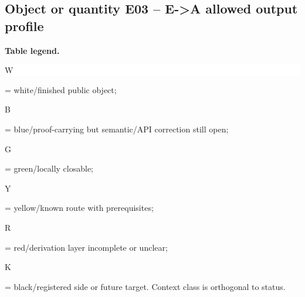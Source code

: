 \subsection*{Object or quantity E03 -- E->A allowed output profile}
\hypertarget{objproof:E03}{}
\par\smallskip\noindent\begin{minipage}{0.99\linewidth}\footnotesize\raggedright\textbf{Table legend.} \colorbox{white}{\strut W} = white/finished public object; \colorbox{cyan!20}{\strut B} = blue/proof-carrying but semantic/API correction still open; \colorbox{green!18}{\strut G} = green/locally closable; \colorbox{yellow!25}{\strut Y} = yellow/known route with prerequisites; \colorbox{red!20}{\strut R} = red/derivation layer incomplete or unclear; \colorbox{black!18}{\strut K} = black/registered side or future target. Context class is orthogonal to status.\end{minipage}\par\vspace{0.25em}
